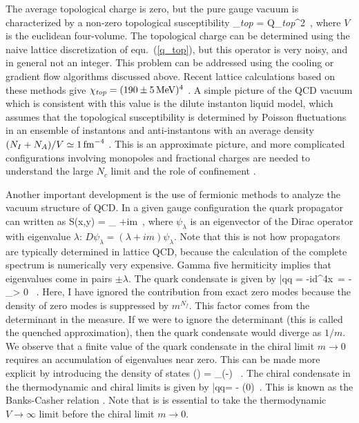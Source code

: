  The average topological charge is zero, but the pure gauge vacuum 
is characterized by a non-zero topological susceptibility
\be
 \chi_{\it top} =  \langle Q_{\it top}^2\rangle \, , 
\ee
where $V$ is the euclidean four-volume. The topological charge
can be determined using the naive lattice discretization of 
equ.~(\ref{q_top}), but this operator is very noisy, and in general not 
an integer. This problem can be addressed using the cooling or gradient 
flow algorithms discussed above. Recent lattice calculations based 
on these methods give $\chi_{\it top} = (190\pm 5\,{\rm MeV})^4$ 
\cite{DelDebbio:2004ns,Ce:2014sfa}. A simple picture of the QCD vacuum 
which is consistent with this value is the dilute instanton liquid
model, which assumes that the topological susceptibility is determined
by Poisson fluctuations in an ensemble of instantons and anti-instantons 
with an average density $(N_I+N_A)/V\simeq 1 \, {\rm fm}^{-4}$
\cite{Schafer:1996wv}. This is an approximate picture, and more 
complicated configurations involving monopoles and fractional charges
are needed to understand the large $N_c$ limit and the role of 
confinement \cite{Poppitz:2012nz}. 

 Another important development is the use of fermionic methods
to analyze the vacuum structure of QCD. In a given gauge configuration
the quark propagator can written as 
\be 
 S(x,y) = \sum_\lambda {}
  {\lambda+im}\, ,
\ee
where $\psi_\lambda$ is an eigenvector of the Dirac operator with 
eigenvalue $\lambda$: $D\psi_\lambda= (\lambda+im)\psi_\lambda$. Note that 
this is not how propagators are typically determined in lattice QCD,
because the calculation of the complete spectrum is numerically very 
expensive. Gamma five hermiticity implies that eigenvalues come 
in pairs $\pm \lambda$. The quark condensate is given by
\be 
 \langle \bar{q}q \rangle = -i\int d^4x\, 
   \left{}\left[S(x,x)\right]\right\rangle 
 = -\left\langle \sum_{\lambda > 0} 
      \right\rangle\, .
\ee
Here, I have ignored the contribution from exact zero modes because
the density of zero modes is suppressed by $m^{N_f}$. This factor
comes from the determinant in the measure. If we were to ignore the
determinant (this is called the quenched approximation), then the 
quark condensate would diverge as $1/m$. We observe that a finite 
value of the quark condensate in the chiral limit $m\to 0$ requires
an accumulation of eigenvalues near zero. This can be made more explicit 
by introducing the density of states
\be 
 \rho(\nu) = \left\langle \sum_{\lambda{}}\delta(\lambda-\nu) 
   \right\rangle \, .   
\ee
The chiral condensate in the thermodynamic and chiral limits is 
given by 
\be 
 \langle\bar{q}q\rangle  = - \pi\rho(0)\, . 
\ee
This is known as the Banks-Casher relation \cite{Banks:1979yr}.
Note that is is essential to take the thermodynamic $V\to\infty$ limit 
before the chiral limit $m\to 0$. 

